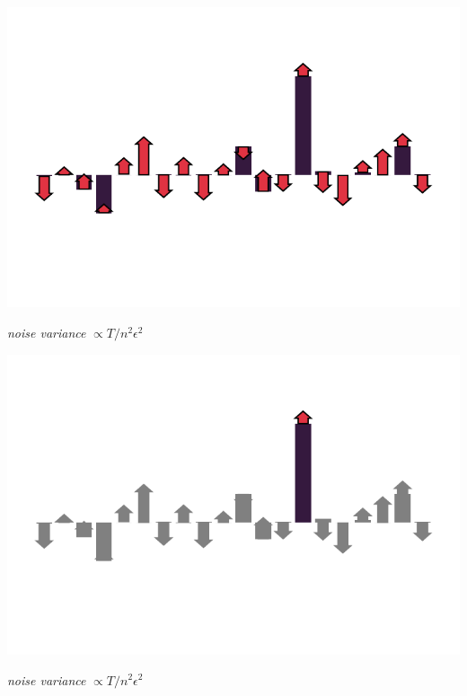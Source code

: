 \documentclass{beamer}
\begin{document}
\begin{frame}
  \vspace{1em}

  \includegraphics[width=\textwidth]{grad_example_noisy_1.pdf}

  \vspace{-1.5em}

  \begin{center}
    \Huge \emph{noise variance} $\propto T/n^2\epsilon^2$
  \end{center}
  \addtocounter{framenumber}{-1}
\end{frame}

\begin{frame}
  \vspace{1em}

  \includegraphics[width=\textwidth]{grad_example_3.pdf}

  \vspace{-1.5em}

  \begin{center}
    \Huge \emph{noise variance} $\propto T/n^2\epsilon^2$
  \end{center}
  \addtocounter{framenumber}{-1}
\end{frame}
\end{document}
